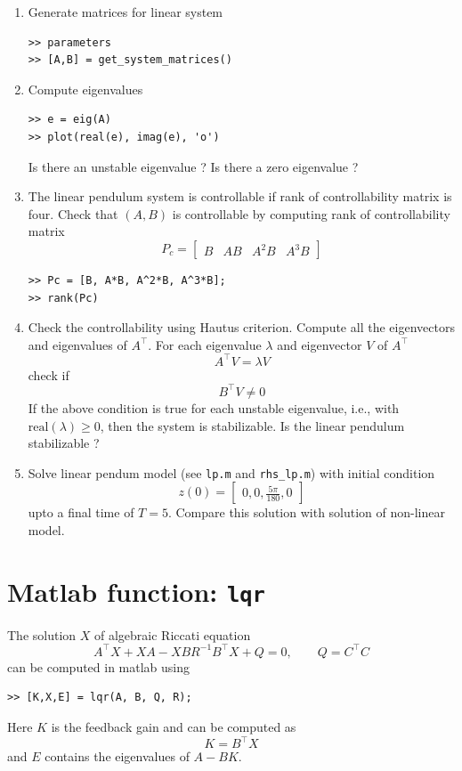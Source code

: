 \documentclass[12pt]{article}
\begin{document}
\begin{enumerate}

\item Generate matrices for linear system
\begin{lstlisting}
>> parameters
>> [A,B] = get_system_matrices()
\end{lstlisting}

\item Compute eigenvalues
\begin{lstlisting}
>> e = eig(A)
>> plot(real(e), imag(e), 'o')
\end{lstlisting}
Is there an unstable eigenvalue ? Is there a zero eigenvalue ?

\item The linear pendulum system is controllable if rank of controllability matrix is four. Check that $(A,B)$ is controllable by computing rank of controllability matrix
\[
P_c = \begin{bmatrix} 
B & A B & A^2 B & A^3 B
\end{bmatrix}
\]
\begin{lstlisting}
>> Pc = [B, A*B, A^2*B, A^3*B];
>> rank(Pc)
\end{lstlisting}

\item Check the controllability using Hautus criterion. Compute all the eigenvectors and eigenvalues of $A^\top$. For each eigenvalue $\lambda$ and eigenvector $V$ of $A^\top$
\[
A^\top V = \lambda V
\]
check if 
\[
B^\top V \ne 0
\]
If the above condition is true for each unstable eigenvalue, i.e., with $\mbox{real}(\lambda) \ge 0$, then the system is stabilizable. Is the linear pendulum stabilizable ?

\item Solve linear pendum model (see {\tt lp.m} and {\tt rhs\_lp.m}) with initial condition 
\[
z(0) = \begin{bmatrix} 0, 0, \frac{5\pi}{180}, 0 \end{bmatrix}
\]
upto a final time of $T=5$. Compare this solution with solution of non-linear model.

\end{enumerate}
\section{Matlab function: {\tt lqr}}
The solution $X$ of algebraic Riccati equation
\begin{equation}
A^\top X + X A - X B R^{-1} B^\top X + Q = 0, \qquad Q = C^\top C
\label{eq:are}
\end{equation}
can be computed in matlab using
\begin{lstlisting}
>> [K,X,E] = lqr(A, B, Q, R);
\end{lstlisting}
Here $K$ is the feedback gain and can be computed as
\[
K = B^\top X
\]
and $E$ contains the eigenvalues of $A-BK$.
\end{document}
